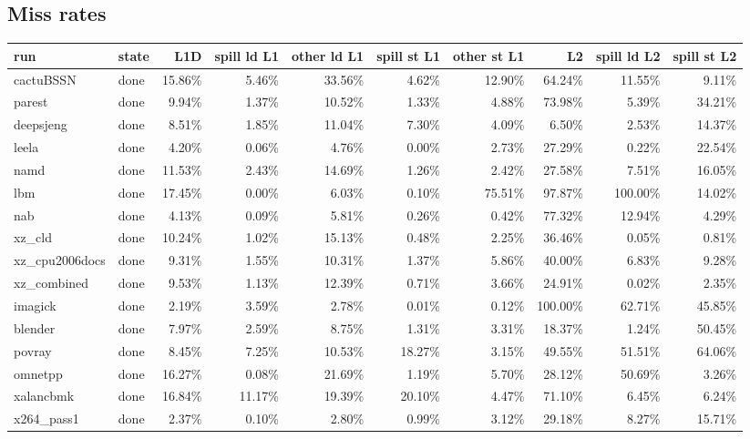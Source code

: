 \documentclass[10pt,a4paper,landscape]{article}
\begin{document}
\subsection*{Miss rates}
{\footnotesize
\begin{longtable}{llrrrrrrrr}
\toprule
run & state & L1D & spill ld L1 & other ld L1 & spill st L1 & other st L1 & L2 & spill ld L2 & spill st L2 \\
\midrule
\endhead
\bottomrule
\endfoot
cactuBSSN & done & 15.86\% & 5.46\% & 33.56\% & 4.62\% & 12.90\% & 64.24\% & 11.55\% & 9.11\% \\
parest & done & 9.94\% & 1.37\% & 10.52\% & 1.33\% & 4.88\% & 73.98\% & 5.39\% & 34.21\% \\
deepsjeng & done & 8.51\% & 1.85\% & 11.04\% & 7.30\% & 4.09\% & 6.50\% & 2.53\% & 14.37\% \\
leela & done & 4.20\% & 0.06\% & 4.76\% & 0.00\% & 2.73\% & 27.29\% & 0.22\% & 22.54\% \\
namd & done & 11.53\% & 2.43\% & 14.69\% & 1.26\% & 2.42\% & 27.58\% & 7.51\% & 16.05\% \\
lbm & done & 17.45\% & 0.00\% & 6.03\% & 0.10\% & 75.51\% & 97.87\% & 100.00\% & 14.02\% \\
nab & done & 4.13\% & 0.09\% & 5.81\% & 0.26\% & 0.42\% & 77.32\% & 12.94\% & 4.29\% \\
xz\_cld & done & 10.24\% & 1.02\% & 15.13\% & 0.48\% & 2.25\% & 36.46\% & 0.05\% & 0.81\% \\
xz\_cpu2006docs & done & 9.31\% & 1.55\% & 10.31\% & 1.37\% & 5.86\% & 40.00\% & 6.83\% & 9.28\% \\
xz\_combined & done & 9.53\% & 1.13\% & 12.39\% & 0.71\% & 3.66\% & 24.91\% & 0.02\% & 2.35\% \\
imagick & done & 2.19\% & 3.59\% & 2.78\% & 0.01\% & 0.12\% & 100.00\% & 62.71\% & 45.85\% \\
blender & done & 7.97\% & 2.59\% & 8.75\% & 1.31\% & 3.31\% & 18.37\% & 1.24\% & 50.45\% \\
povray & done & 8.45\% & 7.25\% & 10.53\% & 18.27\% & 3.15\% & 49.55\% & 51.51\% & 64.06\% \\
omnetpp & done & 16.27\% & 0.08\% & 21.69\% & 1.19\% & 5.70\% & 28.12\% & 50.69\% & 3.26\% \\
xalancbmk & done & 16.84\% & 11.17\% & 19.39\% & 20.10\% & 4.47\% & 71.10\% & 6.45\% & 6.24\% \\
x264\_pass1 & done & 2.37\% & 0.10\% & 2.80\% & 0.99\% & 3.12\% & 29.18\% & 8.27\% & 15.71\% \\

\end{longtable}}
\end{document}
